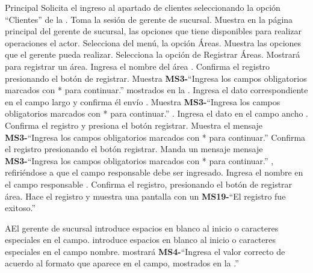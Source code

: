 	\begin{UCtrayectoria}{Principal}
		\UCpaso[\UCactor] Solicita el ingreso al apartado de clientes seleccionando la opción ``Clientes'' de la .
		\UCpaso Toma la sesión de gerente de sucursal.
		\UCpaso Muestra en la página principal del gerente de sucursal, las opciones que tiene disponibles para realizar operaciones el actor.  
		\UCpaso[\UCactor] Selecciona del menú, la opción Áreas.
		\UCpaso Muestra las opciones que el gerente pueda realizar.
		\UCpaso[\UCactor] Selecciona la opción de Registrar Áreas.
		\UCpaso Mostrará   para registrar un área.
		\UCpaso[\UCactor] Ingresa el nombre del área  .
		\UCpaso[\UCactor] Confirma el registro presionando el botón de registrar.
		\UCpaso Muestra {\bf MS3-}``Ingresa los campos obligatorios marcados con * para continuar.''  mostrados en la  .
		\UCpaso[\UCactor] Ingresa el dato correspondiente en el campo largo y confirma él envío .
		\UCpaso Muestra {\bf MS3-}``Ingresa los campos obligatorios marcados con * para continuar.'' .
		\UCpaso[\UCactor] Ingresa el dato en el campo ancho .
		\UCpaso[\UCactor] Confirma el registro y presiona el botón registrar.
		\UCpaso Muestra el mensaje {\bf MS3-}``Ingresa los campos obligatorios marcados con * para continuar.''
		\UCpaso[\UCactor] Confirma el registro presionando el botón registrar.
		\UCpaso Manda un mensaje mensaje {\bf MS3-}``Ingresa los campos obligatorios marcados con * para continuar.'' , refiriéndose a  que el campo responsable debe ser ingresado.
		\UCpaso[\UCactor] Ingresa el nombre en el campo responsable .
		\UCpaso[\UCactor] Confirma el registro, presionando el botón de registrar área.
		\UCpaso Hace el registro y muestra una pantalla con un {\bf MS19-}``El registro fue exitoso.'' 
	\end{UCtrayectoria}
		
		\begin{UCtrayectoriaA}{A}{El gerente de sucursal introduce espacios en blanco al inicio o caracteres especiales en el campo.}
			\UCpaso[\UCactor] introduce espacios en blanco al inicio o caracteres especiales en el campo nombre.
			\UCpaso mostrará {\bf MS4-}``Ingresa el valor correcto de acuerdo al formato que aparece en el campo, mostrados en la .''
		\end{UCtrayectoriaA}

